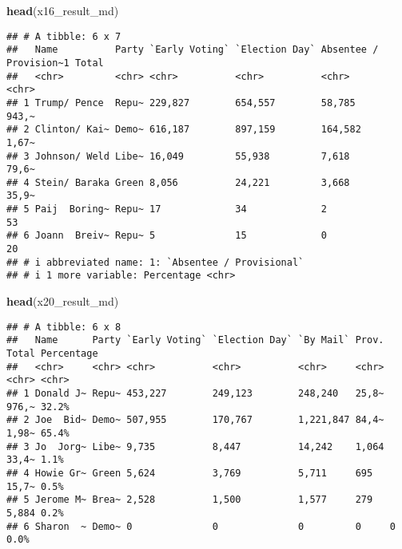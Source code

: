 \documentclass[
]{article}
\newenvironment{Shaded}{\begin{snugshade}}{\end{snugshade}}
\newcommand{\FunctionTok}[1]{\textcolor[rgb]{0.13,0.29,0.53}{\textbf{#1}}}
\newcommand{\NormalTok}[1]{#1}
\begin{document}
\begin{Shaded}
\begin{Highlighting}[]
\FunctionTok{head}\NormalTok{(x16\_result\_md)}
\end{Highlighting}
\end{Shaded}

\begin{verbatim}
## # A tibble: 6 x 7
##   Name          Party `Early Voting` `Election Day` Absentee / Provision~1 Total
##   <chr>         <chr> <chr>          <chr>          <chr>                  <chr>
## 1 Trump/ Pence  Repu~ 229,827        654,557        58,785                 943,~
## 2 Clinton/ Kai~ Demo~ 616,187        897,159        164,582                1,67~
## 3 Johnson/ Weld Libe~ 16,049         55,938         7,618                  79,6~
## 4 Stein/ Baraka Green 8,056          24,221         3,668                  35,9~
## 5 Paij  Boring~ Repu~ 17             34             2                      53   
## 6 Joann  Breiv~ Repu~ 5              15             0                      20   
## # i abbreviated name: 1: `Absentee / Provisional`
## # i 1 more variable: Percentage <chr>
\end{verbatim}

\begin{Shaded}
\begin{Highlighting}[]
\FunctionTok{head}\NormalTok{(x20\_result\_md)}
\end{Highlighting}
\end{Shaded}

\begin{verbatim}
## # A tibble: 6 x 8
##   Name      Party `Early Voting` `Election Day` `By Mail` Prov. Total Percentage
##   <chr>     <chr> <chr>          <chr>          <chr>     <chr> <chr> <chr>     
## 1 Donald J~ Repu~ 453,227        249,123        248,240   25,8~ 976,~ 32.2%     
## 2 Joe  Bid~ Demo~ 507,955        170,767        1,221,847 84,4~ 1,98~ 65.4%     
## 3 Jo  Jorg~ Libe~ 9,735          8,447          14,242    1,064 33,4~ 1.1%      
## 4 Howie Gr~ Green 5,624          3,769          5,711     695   15,7~ 0.5%      
## 5 Jerome M~ Brea~ 2,528          1,500          1,577     279   5,884 0.2%      
## 6 Sharon  ~ Demo~ 0              0              0         0     0     0.0%
\end{verbatim}
\end{document}
